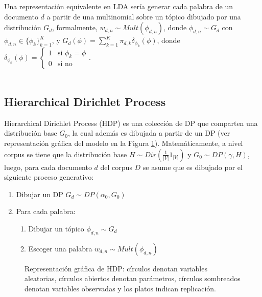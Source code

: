 \documentclass[letterpaper,12pt,oneside]{book} %
\begin{document}
Una representación equivalente en LDA sería generar cada palabra de un documento $d$ a partir de una multinomial sobre un tópico dibujado por una distribución $G_{d}$, formalmente, $w_{d,n}\sim Mult(\phi_{d,n})$, donde $\phi_{d,n} \sim G_{d}$ con $\phi_{d,n} \in \{\phi_{k}\}_{k=1}^{K}$, y $G_{d}(\phi)=\sum_{k=1}^{K}\pi_{d, k}\delta_{\phi_{k}}(\phi)$, donde $\delta_{\phi_{k}}(\phi) = \begin{cases}
    1 & \text{si $\phi_{k}=\phi$}  \\
    0 & \text{si no}
  \end{cases}$.\\\\

\subsection{Hierarchical Dirichlet Process}

Hierarchical Dirichlet Process (HDP) es una colección de DP que comparten una distribución base $G_{0}$, la cual además es dibujada a partir de un DP (ver representación gráfica del modelo en la Figura \ref{img:hdp}). Matemáticamente, a nivel corpus se tiene que la distribución base $H \sim Dir(\frac{1}{|V|}1_{|V|})$ y $G_{0} \sim DP(\gamma, H)$, luego, para cada documento $d$ del corpus $D$ se asume que es dibujado por el siguiente proceso generativo:
\begin{enumerate}
    \item Dibujar un DP $G_{d} \sim DP(\alpha_{0}, G_{0})$
    \item Para cada palabra:
    \begin{enumerate}
        \item Dibujar un tópico $\phi_{d,n}\sim G_{d}$
        \item Escoger una palabra $w_{d,n} \sim Mult(\phi_{d,n})$
    \end{enumerate}
\end{enumerate}

\begin{figure}
  \centering
\caption{Representación gráfica de HDP: círculos denotan variables aleatorias, círculos abiertos denotan parámetros, círculos sombreados denotan variables observadas y los platos indican replicación.}
\label{img:hdp}
\end{figure}
\end{document}
